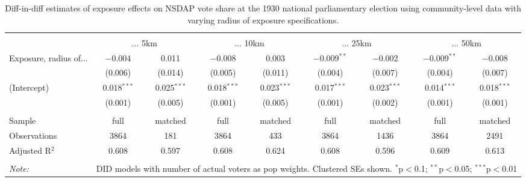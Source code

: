 
\begin{table}[!htbp] \centering 
  \caption{Diff-in-diff estimates of exposure effects on NSDAP vote share at the 1930 national parliamentary election using community-level data with varying radius of exposure specifications.\vspace{-.25cm}} 
  \label{tab:nsdap-voteshare-radius-dd} 
\scriptsize 
\begin{tabular}{@{\extracolsep{5pt}}lcccccccc} 
\\[-1.8ex]\hline 
\hline \\[-1.8ex] 
 & \multicolumn{2}{c}{... 5km} & \multicolumn{2}{c}{... 10km} & \multicolumn{2}{c}{... 25km} & \multicolumn{2}{c}{... 50km} \\ 
 \cmidrule(r){2-3}\cmidrule(r){4-5}\cmidrule(r){6-7}\cmidrule(r){8-9}Exposure, radius of... & $-$0.004 & 0.011 & $-$0.008 & 0.003 & $-$0.009$^{**}$ & $-$0.002 & $-$0.009$^{**}$ & $-$0.008 \\ 
  & (0.006) & (0.014) & (0.005) & (0.011) & (0.004) & (0.007) & (0.004) & (0.007) \\ 
  (Intercept) & 0.018$^{***}$ & 0.025$^{***}$ & 0.018$^{***}$ & 0.023$^{***}$ & 0.017$^{***}$ & 0.023$^{***}$ & 0.014$^{***}$ & 0.018$^{***}$ \\ 
  & (0.001) & (0.005) & (0.001) & (0.005) & (0.001) & (0.002) & (0.001) & (0.001) \\ 
 \hline \\[-1.8ex] 
Sample & full & matched & full & matched & full & matched & full & matched \\ 
Observations & 3864 & 181 & 3864 & 433 & 3864 & 1436 & 3864 & 2491 \\ 
Adjusted R$^{2}$ & 0.608 & 0.597 & 0.608 & 0.624 & 0.608 & 0.596 & 0.609 & 0.613 \\ 
\hline 
\hline \\[-1.8ex] 
\textit{Note:}  & \multicolumn{8}{r}{DID models with number of actual voters as pop weights. Clustered SEs shown. $^{*}$p$<$0.1; $^{**}$p$<$0.05; $^{***}$p$<$0.01} \\ 
\end{tabular} 
\end{table} 
